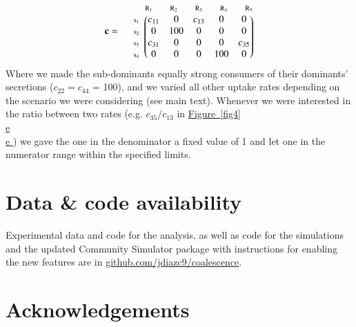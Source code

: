\documentclass[a4paper,10pt]{article}
\newcommand{\figref}[2][]{%
  \hyperref[{#2}]{%
    Figure~\ref*{#2}%
    \ifx\\#1\\%
    \else
      #1%
    \fi
  }%
}
\begin{document}
\begin{equation*}
\mathbf{c} = \; \; \; \; \; \begin{matrix}
 & 

\begin{matrix}
\text{\scriptsize $\mathrm{R}_1$} \;\;\; & 
\text{\scriptsize $\mathrm{R}_2$} \;\;\; & 
\text{\scriptsize $\mathrm{R}_3$} \;\;\; & 
\text{\scriptsize $\mathrm{R}_4$} \;\;\; & 
\text{\scriptsize $\mathrm{R}_5$}
\end{matrix}

\\ 

\begin{matrix*}[l]
\text{\scriptsize $\mathrm{s}_1$} \!\!\! \\
\text{\scriptsize $\mathrm{s}_2$} \!\!\! \\
\text{\scriptsize $\mathrm{s}_3$} \!\!\! \\
\text{\scriptsize $\mathrm{s}_4$} \!\!\!
\end{matrix*}

& 

\begin{pmatrix}
c_{11} & 0 & c_{13} & 0 & 0 \\
0 & 100 & 0 & 0 & 0 \\
c_{31} & 0 & 0 & 0 & c_{35} \\
0 & 0 & 0 & 100 & 0
\end{pmatrix}

\end{matrix}
\end{equation*}
%
Where we made the sub-dominants equally strong consumers of their dominants' secretions
($c_{22} = c_{44}$ = 100),
and we varied all other uptake rates depending on the scenario we were considering (see main text).
Whenever we were interested in the ratio between two rates (e.g. $c_{35}/c_{13}$ in \figref[e]{fig4})
we gave the one in the denominator a fixed value of 1 and let one in the numerator range
within the specified limits.

\section*{Data \& code availability}\label{datacode}

Experimental data and code for the analysis, as well as code for the simulations
and the updated Community Simulator package with instructions for enabling the
new features are in \url{github.com/jdiazc9/coalescence}.

\section*{Acknowledgements}
\end{document}
